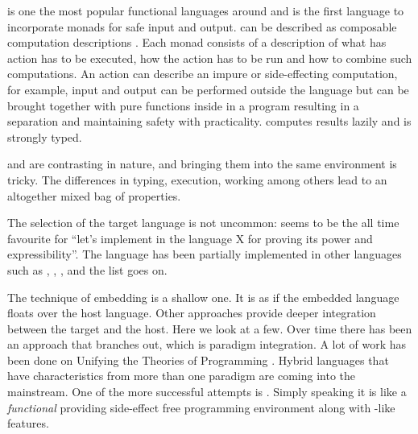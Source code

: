 \documentclass[thesis-solanki.tex]{subfiles}
\begin{document}
 is one the most popular \cite{website:langpop} functional languages around and is the first
language to incorporate monads \cite{wadler1992comprehending} for safe input and output.
can be 
described as composable computation descriptions \cite{website:monadshaskellorg}.
Each monad
consists of a description of what has action has to be executed, how the action has to be run and how to combine
such computations.
An action can describe an impure or side-effecting computation, for example, input and output can be performed
outside the language but can be brought together with pure functions inside in a program resulting in a separation
and maintaining safety with practicality.
 computes results lazily and is strongly typed.

 and  are contrasting in nature, and bringing them into the same environment is
tricky.
The differences in typing, execution, working among others lead to an altogether mixed bag of properties.


The selection of the target language is not uncommon:  seems to be the all time favourite for
``let's implement  in the language X for proving its power and expressibility''.
The  language has been partially implemented \cite{swipembedd} in other languages such as
 \cite{racklog}, 
\cite{komorowski1982qlog,robinson1982loglisp,robinson1980loglisp},  \cite{wikiprolog, jlog},
 \cite{jscriptlog} and the list \cite{yieldprolog} goes on.

The technique of embedding is a shallow one.
It is as if the embedded language floats over the host language.
Other approaches provide deeper integration between the target and the host.
Here we look at a few.
Over time there has been an approach that branches out, which is paradigm integration.
A lot of work has been done on Unifying the Theories of Programming
\cite{DBLP:conf/utp/2006,DBLP:conf/utp/2008,DBLP:conf/utp/2010,DBLP:conf/utp/2012,hoare1998unifying,
  gibbons2013unifying}.
Hybrid languages that have characteristics from more than one paradigm are coming into the mainstream.
One of the more successful attempts is  \cite{website:scala}.
Simply speaking it is like a \textit{functional}  providing side-effect free programming environment
along with -like features.
\end{document}

